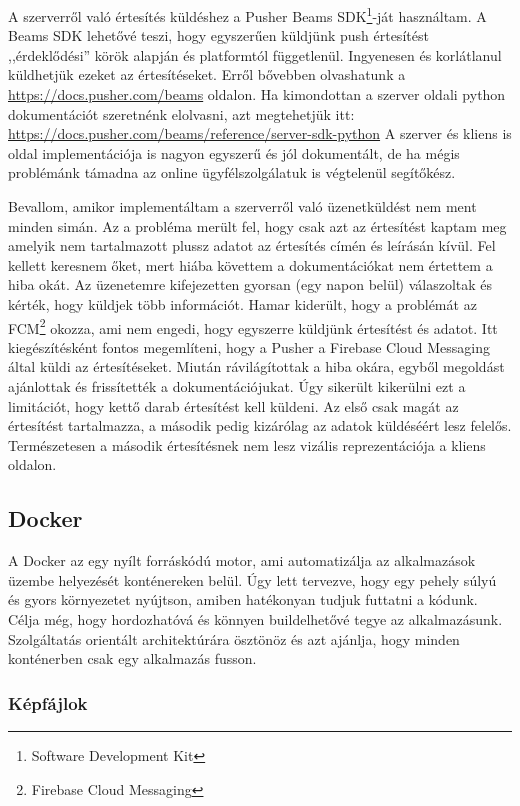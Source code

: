 \documentclass{thesis-ekf}
\theoremstyle{definition}
\theoremstyle{remark}
\begin{document}
A szerverről való értesítés küldéshez a Pusher Beams SDK\footnote{Software Development Kit}-ját használtam.
A Beams SDK lehetővé teszi, hogy egyszerűen küldjünk push értesítést ,,érdeklődési'' körök alapján és platformtól függetlenül.
Ingyenesen és korlátlanul küldhetjük ezeket az értesítéseket. Erről bővebben olvashatunk a \url{https://docs.pusher.com/beams} oldalon.
Ha kimondottan a szerver oldali python dokumentációt szeretnénk elolvasni, azt megtehetjük itt: \url{https://docs.pusher.com/beams/reference/server-sdk-python}
A szerver és kliens is oldal implementációja is nagyon egyszerű és jól dokumentált, de ha mégis problémánk támadna az online ügyfélszolgálatuk is végtelenül segítőkész.

Bevallom, amikor implementáltam a szerverről való üzenetküldést nem ment minden simán.
Az a probléma merült fel, hogy csak azt az értesítést kaptam meg amelyik nem tartalmazott plussz adatot az értesítés címén és leírásán kívül.
Fel kellett keresnem őket, mert hiába követtem a dokumentációkat nem értettem a hiba okát.
Az üzenetemre kifejezetten gyorsan (egy napon belül) válaszoltak és kérték, hogy küldjek több információt.
Hamar kiderült, hogy a problémát az FCM\footnote{Firebase Cloud Messaging} okozza, ami nem engedi, hogy egyszerre küldjünk értesítést és adatot.
Itt kiegészítésként fontos megemlíteni, hogy a Pusher a Firebase Cloud Messaging által küldi az értesítéseket.
Miután rávilágítottak a hiba okára, egyből megoldást ajánlottak és frissítették a dokumentációjukat.
Úgy sikerült kikerülni ezt a limitációt, hogy kettő darab értesítést kell küldeni.
Az első csak magát az értesítést tartalmazza, a második pedig kizárólag az adatok küldéséért lesz felelős.
Természetesen a második értesítésnek nem lesz vizális reprezentációja a kliens oldalon.

\subsection{Docker}\label{docker}

A Docker az egy nyílt forráskódú motor, ami automatizálja az alkalmazások üzembe helyezését konténereken belül.
Úgy lett tervezve, hogy egy pehely súlyú és gyors környezetet nyújtson, amiben hatékonyan tudjuk futtatni a kódunk.
Célja még, hogy hordozhatóvá és könnyen buildelhetővé tegye az alkalmazásunk.
Szolgáltatás orientált architektúrára ösztönöz és azt ajánlja, hogy minden konténerben csak egy alkalmazás fusson.\cite{docker}

\subsubsection{Képfájlok}
\end{document}
